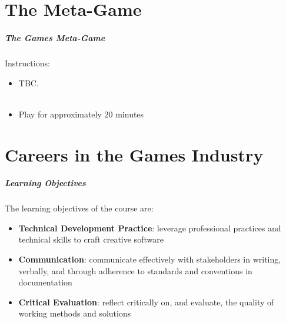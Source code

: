



\part{The Meta-Game}
\frame{\partpage}

\begin{frame}
	\frametitle{The Games Meta-Game}
	
	Instructions:
	
	\begin{itemize}
		\item TBC.
		\\~\\
		\item Play for approximately 20 minutes
	\end{itemize}
\end{frame}
   
\part{Careers in the Games Industry}
\frame{\partpage}

\begin{frame}
	\frametitle{Learning Objectives}
	
	The learning objectives of the course are:
	
	\begin{itemize}
		\item \textbf{Technical Development Practice}: leverage professional practices and technical skills to craft creative software \pause
		\item \textbf{Communication}: communicate effectively with stakeholders in writing, verbally, and through adherence to standards and conventions in documentation \pause
		\item \textbf{Critical Evaluation}: reflect critically on, and evaluate, the quality of working methods and solutions
	\end{itemize}
\end{frame}

